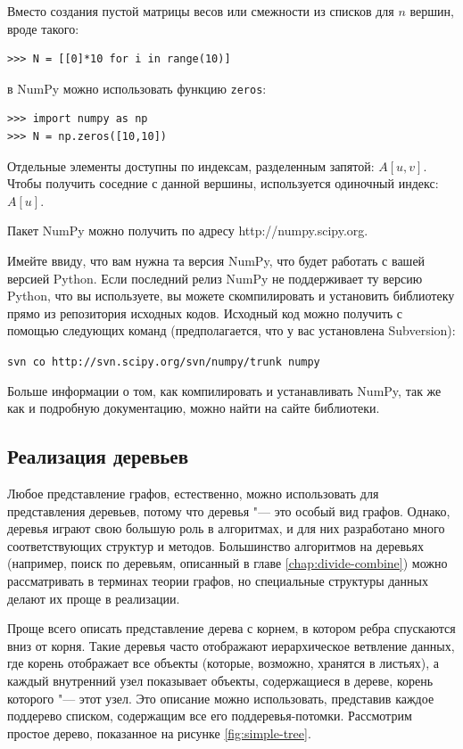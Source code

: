 Вместо создания пустой матрицы весов или смежности из списков для $n$ вершин, вроде такого:
\begin{lstlisting}
>>> N = [[0]*10 for i in range(10)]
\end{lstlisting}
в NumPy можно использовать функцию \texttt{zeros}:
\begin{lstlisting}
>>> import numpy as np
>>> N = np.zeros([10,10])
\end{lstlisting}

Отдельные элементы доступны по индексам, разделенным запятой: $A[u,v]$. Чтобы получить соседние с данной вершины, используется одиночный индекс: $A[u]$.

Пакет NumPy можно получить по адресу http://numpy.scipy.org.

Имейте ввиду, что вам нужна та версия NumPy, что будет работать с вашей версией Python. Если последний релиз NumPy не поддерживает ту версию Python, что вы используете, вы можете скомпилировать и установить библиотеку прямо из репозитория исходных кодов. Исходный код можно получить с помощью следующих команд (предполагается, что у вас установлена Subversion):

\texttt{svn co http://svn.scipy.org/svn/numpy/trunk numpy}

Больше информации о том, как компилировать и устанавливать NumPy, так же как и подробную документацию, можно найти на сайте библиотеки.

\subsection{Реализация деревьев}

Любое представление графов, естественно, можно использовать для представления деревьев, потому что деревья "--- это особый вид графов. Однако, деревья играют свою большую роль в алгоритмах, и для них разработано много соответствующих структур и методов. Большинство алгоритмов на деревьях (например, поиск по деревьям, описанный в главе \ref{chap:divide-combine}) можно рассматривать в терминах теории графов, но специальные структуры данных делают их проще в реализации. 

Проще всего описать представление дерева с корнем, в котором ребра спускаются вниз от корня. Такие деревья часто отображают иерархическое ветвление данных, где корень отображает все объекты (которые, возможно, хранятся в листьях), а каждый внутренний узел показывает объекты, содержащиеся в дереве, корень которого "--- этот узел. Это описание можно использовать, представив каждое поддерево списком, содержащим все его поддеревья-потомки. Рассмотрим простое дерево, показанное на рисунке \ref{fig:simple-tree}.

